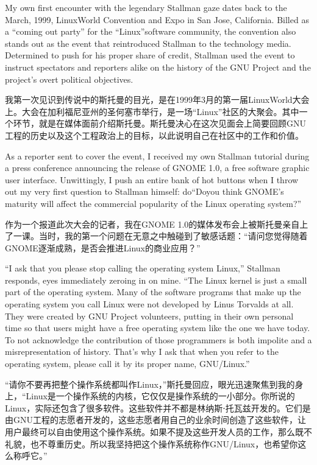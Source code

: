 \ifdefined\eng
My own first encounter with the legendary Stallman gaze dates back to the March, 1999, LinuxWorld Convention and Expo in San Jose, California. Billed as a ``coming out party'' for the \ifdefined\vtwo ``\fi Linux\ifdefined\vtwo ''\fi software community, the convention also stands out as the event that reintroduced Stallman to the technology media. Determined to push for his proper share of credit, Stallman used the event to instruct spectators and reporters alike on the history of the GNU Project and the project's overt political objectives.
\fi

\ifdefined\chs
我第一次见识到传说中的斯托曼的目光，是在1999年3月的第一届LinuxWorld大会上。大会在加利福尼亚州的圣何塞市举行，是一场``Linux''社区的大聚会。其中一个环节，就是在媒体面前介绍斯托曼。斯托曼决心在这次见面会上简要回顾GNU工程的历史以及这个工程政治上的目标，以此说明自己在社区中的工作和价值。
\fi

\ifdefined\eng
As a reporter sent to cover the event, I received my own Stallman tutorial during a press conference announcing the release of GNOME 1.0, a free software graphic user interface. Unwittingly, I push an entire bank of hot buttons when I throw out my very first question to Stallman himself: \ifdefined\vone do\fi\ifdefined\vtwo ``Do\fi you think GNOME's maturity will affect the commercial popularity of the Linux operating system?\ifdefined\vtwo ''\fi
\fi

\ifdefined\chs
作为一个报道此次大会的记者，我在GNOME 1.0的媒体发布会上被斯托曼亲自上了一课。当时，我的第一个问题在无意之中触碰到了敏感话题：``请问您觉得随着GNOME逐渐成熟，是否会推进Linux的商业应用？''
\fi

\ifdefined\eng
``I ask that you please stop calling the operating system Linux,'' Stallman responds, eyes immediately zeroing in on mine. ``The Linux kernel is just a small part of the operating system. Many of the software programs that make up the operating system you call Linux were not developed by Linus Torvalds at all. They were created by GNU Project volunteers, putting in their own personal time so that users might have a free operating system like the one we have today. To not acknowledge the contribution of those programmers is both impolite and a misrepresentation of history. That's why I ask that when you refer to the operating system, please call it by its proper name, GNU/Linux.''
\fi

\ifdefined\chs
``请你不要再把整个操作系统都叫作Linux，''斯托曼回应，眼光迅速聚焦到我的身上，``Linux是一个操作系统的内核，它仅仅是操作系统的一小部分。你所说的Linux，实际还包含了很多软件。这些软件并不都是林纳斯⋅托瓦兹开发的。它们是由GNU工程的志愿者开发的，这些志愿者用自己的业余时间创造了这些软件，让用户最终可以自由使用这个操作系统。如果不提及这些开发人员的工作，那么既不礼貌，也不尊重历史。所以我坚持把这个操作系统称作GNU/Linux，也希望你这么称呼它。''
\fi

